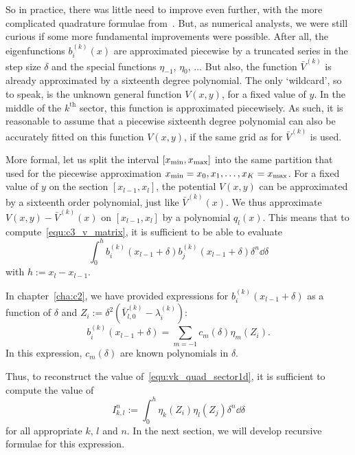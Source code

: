 So in practice, there was little need to improve even further, with the more complicated quadrature formulae from~\cite{ixaru_operations_1997,kim_quadrature_2002,conte_modified_2016}. But, as numerical analysts, we were still curious if some more fundamental improvements were possible. After all, the eigenfunctions $b_i^{(k)}(x)$ are approximated piecewise by a truncated series in the step size $\delta$ and the special functions $\eta_{-1}$, $\eta_{0}$, $\dots$ But also, the function $\bar{V}^{(k)}$ is already approximated by a sixteenth degree polynomial. The only `wildcard', so to speak, is the unknown general function $V(x, y)$, for a fixed value of $y$. In the middle of the $k^\text{th}$ sector, this function is approximated piecewisely. As such, it is reasonable to assume that a piecewise sixteenth degree polynomial can also be accurately fitted on this function $V(x, y)$, if the same grid as for $\bar{V}^{(k)}$ is used.

More formal, let us split the interval $[{x_{\text{min}}}, {x_{\text{max}}}]$ into the same partition that  used for the piecewise approximation ${x_{\text{min}}} = x_0, x_1, \dots, x_K = {x_{\text{max}}}$. For a fixed value of $y$ on the section $[x_{l-1}, x_l]$, the potential $V(x, y)$ can be approximated by a sixteenth order polynomial, just like $\bar{V}^{(k)}(x)$. We thus approximate $V(x, y) - \bar{V}^{(k)}(x)$ on $[x_{l-1}, x_l]$ by a polynomial $q_l(x)$. This means that to compute~\eqref{equ:c3_v_matrix}, it is sufficient to be able to evaluate
\begin{equation}\label{equ:vk_quad_sector1d}
  \int_{0}^{h} b_i^{(k)}(x_{l-1}+\delta)b_j^{(k)}(x_{l-1}+\delta)\delta^n\dd \delta
\end{equation}
with $h := x_l-x_{l-1}$.

In chapter~\ref{cha:c2}, we have provided expressions for $b_i^{(k)}(x_{l-1}+\delta)$ as a function of $\delta$ and $Z_i := \delta^2\left(\bar{V}^{(k)}_{l,0}- \lambda^{(k)}_i\right)$:
$$
  b_i^{(k)}(x_{l-1}+\delta) = \sum_{m=-1} c_m(\delta) \eta_m(Z_i)\text{.}
$$
In this expression, $c_m(\delta)$ are known polynomials in $\delta$.

Thus, to reconstruct the value of~\eqref{equ:vk_quad_sector1d}, it is sufficient to compute the value of
\begin{equation}\label{equ:c3_eta_eta_inegral}
  I_{k,l}^n := \int_0^h \eta_k(Z_i) \eta_l(Z_j) \delta^n \dd \delta
\end{equation}
for all appropriate $k$, $l$ and $n$. In the next section, we will develop recursive formulae for this expression.

